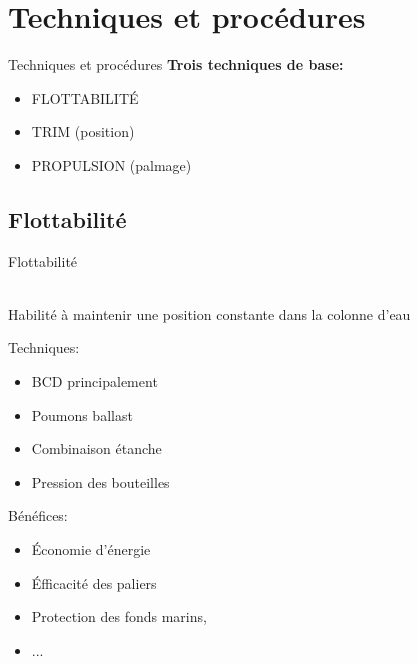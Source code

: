 
\section{Techniques et procédures}

\begin{frame}{Techniques et procédures}  
	\textbf{Trois techniques de base:}
	\begin{itemize}
		\item FLOTTABILITÉ
		\item TRIM (position)
		\item PROPULSION (palmage)
	\end{itemize}
\end{frame}

\subsection{Flottabilité}

\begin{frame}{Flottabilité}  
	\begin{center}
		\resizebox{!}{18pt}{\strut\textbf{\insertsubsection}\strut}\\
		Habilité à maintenir une position constante dans la colonne d'eau
	\end{center}
	\vfill
	\begin{multicols}{2}
		Techniques:
		\begin{itemize}
			\item BCD principalement
			\item Poumons ballast
			\item Combinaison étanche
			\item Pression des bouteilles
		\end{itemize}

		\columnbreak

		Bénéfices:
		\begin{itemize}
			\item Économie d'énergie
			\item Éfficacité des paliers
			\item Protection des fonds marins,
			\item ...
		\end{itemize}
	\end{multicols}
\end{frame}

